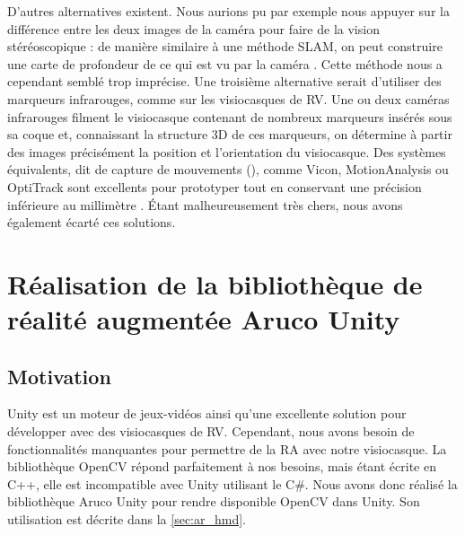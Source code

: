 

D'autres alternatives existent. Nous aurions pu par exemple nous appuyer sur la différence entre les deux images de la caméra pour faire de la vision stéréoscopique : de manière similaire à une méthode SLAM, on peut construire une carte de profondeur de ce qui est vu par la caméra . Cette méthode nous a cependant semblé trop imprécise. Une troisième alternative serait d'utiliser des marqueurs infrarouges, comme sur les visiocasques de RV. Une ou deux caméras infrarouges filment le visiocasque contenant de nombreux marqueurs insérés sous sa coque  et, connaissant la structure 3D de ces marqueurs, on détermine à partir des images précisément la position et l'orientation du visiocasque. Des systèmes équivalents, dit de capture de mouvements (), comme Vicon, MotionAnalysis ou OptiTrack sont excellents pour prototyper tout en conservant une précision inférieure au millimètre . Étant malheureusement très chers, nous avons également écarté ces solutions.


\section{Réalisation de la bibliothèque de réalité augmentée Aruco Unity}
\label{sec:aruco_unity}

\subsection{Motivation}
\label{subsec:aruco_unity_motivation}
Unity est un moteur de jeux-vidéos ainsi qu'une excellente solution pour développer avec des visiocasques de RV. Cependant, nous avons besoin de fonctionnalités manquantes pour permettre de la RA avec notre visiocasque. La bibliothèque OpenCV répond parfaitement à nos besoins, mais étant écrite en C++, elle est incompatible avec Unity utilisant le C\#. Nous avons donc réalisé la bibliothèque Aruco Unity pour rendre disponible OpenCV dans Unity. Son utilisation est décrite dans la \autoref{sec:ar_hmd}.

